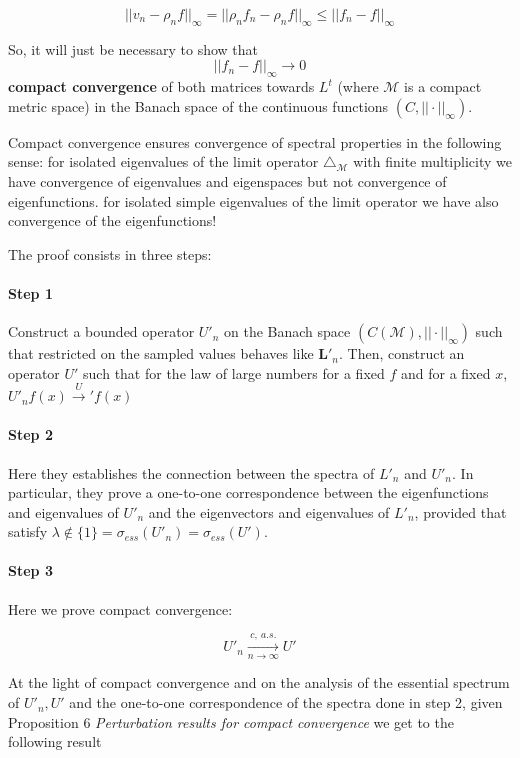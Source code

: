 $$||v_n-\rho_nf||_\infty = ||\rho_nf_n-\rho_nf||_\infty\leq ||f_n-f||_\infty$$


So, it will just be necessary to show that  $$||f_n-f||_\infty\rightarrow 0$$
 \textbf{compact convergence} of both matrices towards $L^t$ (where $\mathcal M$ is a compact metric space) in the Banach space of the continuous functions $(C, ||\cdot||_\infty)$. 

Compact convergence ensures convergence of spectral properties in the following sense: for isolated eigenvalues of the limit operator $\triangle_\mathcal M$ with finite multiplicity we have convergence of eigenvalues and eigenspaces but not convergence of eigenfunctions. for isolated simple eigenvalues of the limit operator we have also convergence of the eigenfunctions!

The proof consists in three steps:
\paragraph{Step 1} Construct a bounded operator $U'_n$ on the Banach space $(C(\mathcal M), ||\cdot||_\infty)$ such that restricted on the sampled values behaves like $\mathbf{L}'_n$. Then, construct an operator $U'$ such that for the law of large numbers for a fixed $f$ and for a fixed $x$, $U'_nf(x) \xrightarrow U'f(x) $
\paragraph{Step 2} Here they establishes the connection between the spectra of $L'_n$ and $U'_n$. In particular, they prove a one-to-one correspondence between the eigenfunctions and eigenvalues of $U'_n$ and the eigenvectors and eigenvalues of $L'_n$, provided that satisfy $\lambda\notin \{1\}=\sigma_{ess}(U'_n)= \sigma_{ess}(U')$.
\paragraph{Step 3} Here we prove compact convergence:

$$U'_n \xrightarrow[n\to\infty]{c,\ a.s.}U'$$

At the light of compact convergence and on the analysis of the essential spectrum of $U'_n, U'$ and the one-to-one correspondence of the spectra done in step 2, given Proposition 6 \textit{Perturbation results for compact convergence} we get to the following result

